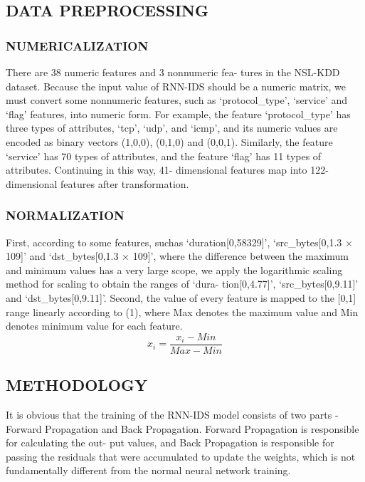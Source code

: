 \documentclass[12pt]{report}	%
\begin{document}
\subsection{DATA PREPROCESSING}
\subsubsection{NUMERICALIZATION}
There are 38 numeric features and 3 nonnumeric fea-
tures in the NSL-KDD dataset. Because the input value of
RNN-IDS should be a numeric matrix, we must convert some
nonnumeric features, such as ‘protocol\_type’, ‘service’ and
‘flag’ features, into numeric form. For example, the feature
‘protocol\_type’ has three types of attributes, ‘tcp’, ‘udp’,
and ‘icmp’, and its numeric values are encoded as binary vectors (1,0,0), (0,1,0) and (0,0,1). Similarly, the feature
‘service’ has 70 types of attributes, and the feature ‘flag’
has 11 types of attributes. Continuing in this way, 41-
dimensional features map into 122-dimensional features after
transformation.

\subsubsection{NORMALIZATION}
First, according to some features, suchas ‘duration[0,58329]’,
‘src\_bytes[0,1.3 × 109]’ and ‘dst\_bytes[0,1.3 × 109]’,
where the difference between the maximum and minimum
values has a very large scope, we apply the logarithmic
scaling method for scaling to obtain the ranges of ‘dura-
tion[0,4.77]’, ‘src\_bytes[0,9.11]’ and ‘dst\_bytes[0,9.11]’.
Second, the value of every feature is mapped to the [0,1] range
linearly according to (1), where Max denotes the maximum
value and Min denotes minimum value for each feature.
           $$ x_{i}=\dfrac{x_{i}-Min}{Max - Min} $$


\subsection{METHODOLOGY}
It is obvious that the training of the RNN-IDS model consists
of two parts - Forward Propagation and Back Propagation.
Forward Propagation is responsible for calculating the out-
put values, and Back Propagation is responsible for passing
the residuals that were accumulated to update the weights,
which is not fundamentally different from the normal neural
network training.
\end{document}
